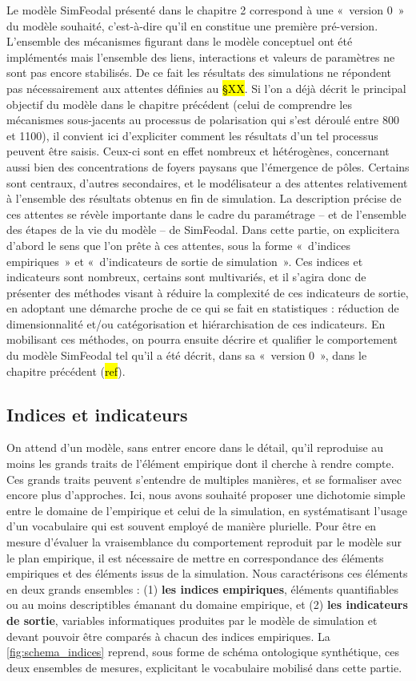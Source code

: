 Le modèle SimFeodal présenté dans le chapitre 2 correspond à une « version 0 » du modèle souhaité, c'est-à-dire qu'il en constitue une première pré-version.
	L'ensemble des mécanismes figurant dans le modèle conceptuel ont été implémentés mais l'ensemble des liens, interactions et valeurs de paramètres ne sont pas encore stabilisés.
	De ce fait les résultats des simulations ne répondent pas nécessairement aux attentes définies au \hl{§XX}.
	Si l'on a déjà décrit le principal objectif du modèle dans le chapitre précédent (celui de comprendre les mécanismes sous-jacents au processus de polarisation qui s'est déroulé entre 800 et 1100), il convient ici d'expliciter comment les résultats d'un tel processus peuvent être saisis.
Ceux-ci sont en effet nombreux et hétérogènes, concernant aussi bien des concentrations de foyers paysans que l'émergence de pôles.
Certains sont centraux, d'autres secondaires, et le modélisateur a des attentes relativement à l'ensemble des résultats obtenus en fin de simulation.
La description précise de ces attentes se révèle importante dans le cadre du paramétrage -- et de l'ensemble des étapes de la vie du modèle -- de SimFeodal.
Dans cette partie, on explicitera d'abord le sens que l'on prête à ces attentes, sous la forme « d'indices empiriques » et « d'indicateurs de sortie de simulation ».
Ces indices et indicateurs sont nombreux, certains sont multivariés, et il s'agira donc de présenter des méthodes visant à réduire la complexité de ces indicateurs de sortie, en adoptant une démarche proche de ce qui se fait en statistiques : réduction de dimensionnalité et/ou catégorisation et hiérarchisation de ces indicateurs.
En mobilisant ces méthodes, on pourra ensuite décrire et qualifier le comportement du modèle SimFeodal tel qu'il a été décrit, dans sa « version 0 », dans le chapitre précédent (\hl{ref}).

\subsection{Indices et indicateurs}

On attend d'un modèle, sans entrer encore dans le détail, qu'il reproduise au moins les grands traits de l'élément empirique dont il cherche à rendre compte.
Ces grands traits peuvent s'entendre de multiples manières, et se formaliser avec encore plus d'approches.
Ici, nous avons souhaité proposer une dichotomie simple entre le domaine de l'empirique et celui de la simulation, en systématisant l'usage d'un vocabulaire qui est souvent employé de manière plurielle.
Pour être en mesure d'évaluer la vraisemblance du comportement reproduit par le modèle sur le plan empirique, il est nécessaire de mettre en correspondance des éléments empiriques et des éléments issus de la simulation.
Nous caractérisons ces éléments en deux grands ensembles :
(1) \textbf{les indices empiriques}, éléments quantifiables ou au moins descriptibles émanant du domaine empirique, et  (2) \textbf{les indicateurs de sortie}, variables informatiques produites par le modèle de simulation et devant pouvoir être comparés à chacun des indices empiriques.
La \cref{fig:schema_indices} reprend, sous forme de schéma ontologique synthétique, ces deux ensembles de mesures, explicitant le vocabulaire mobilisé dans cette partie.

